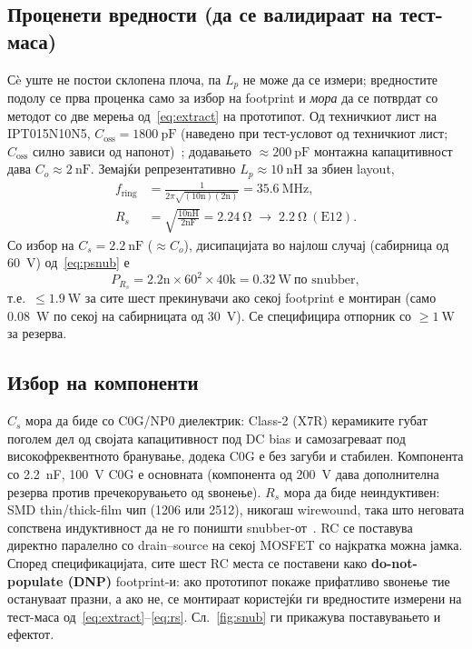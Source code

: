 \documentclass[journal,onecolumn,11pt]{IEEEtran}
\begin{document}
\subsection{Проценети вредности (да се валидираат на тест-маса)}
Сè уште не постои склопена плоча, па $L_p$ не може да се измери; вредностите подолу се
прва проценка само за избор на footprint и \emph{мора} да се потврдат со методот со
две мерења од~\eqref{eq:extract} на прототипот. Од техничкиот лист на IPT015N10N5,
$C_{\mathrm{oss}}=\SI{1800}{\pico\farad}$ (наведено при тест-условот од техничкиот лист;
$C_{\mathrm{oss}}$ силно зависи од напонот)~\cite{ipt015ds,ipt015part}; додавањето
$\approx\SI{200}{\pico\farad}$ монтажна капацитивност дава $C_o\approx\SI{2}{\nano\farad}$.
Земајќи репрезентативно $L_p\approx\SI{10}{\nano\henry}$ за збиен layout,
\begin{align}
f_{\mathrm{ring}}&=\frac{1}{2\pi\sqrt{(10\text{n})(2\text{n})}}=\SI{35.6}{\mega\hertz},\\
R_s&=\sqrt{\frac{10\text{nH}}{2\text{nF}}}=\SI{2.24}{\ohm}\;\to\;\SI{2.2}{\ohm}\ (\text{E12}).
\end{align}
Со избор на $C_s=\SI{2.2}{\nano\farad}$ ($\approx C_o$), дисипацијата во најлош случај
(сабирница од \SI{60}{\volt}) од~\eqref{eq:psnub} е
\begin{equation}
P_{R_s}=2.2\text{n}\times 60^{2}\times 40\text{k}=\SI{0.32}{\watt}\ \text{по snubber},
\end{equation}
т.е.\ $\le\SI{1.9}{\watt}$ за сите шест прекинувачи ако секој footprint е монтиран
(само \SI{0.08}{\watt} по секој на сабирницата од \SI{30}{\volt}). Се специфицира
отпорник со $\ge\SI{1}{\watt}$ за резерва.

\subsection{Избор на компоненти}
$C_s$ мора да биде со C0G/NP0 диелектрик: Class-2 (X7R) керамиките губат поголем дел
од својата капацитивност под DC bias и самозагреваат под високофреквентното бранување,
додека C0G е без загуби и стабилен. Компонента со \SI{2.2}{\nano\farad}, \SI{100}{\volt}
C0G е основната (компонента од \SI{200}{\volt} дава дополнителна резерва против
пречекорувањето од ѕвонење). $R_s$ мора да биде неиндуктивен: SMD thin/thick-film чип
(1206 или 2512), никогаш wirewound, така што неговата сопствена индуктивност да не го
поништи snubber-от~\cite{severns}. RC се поставува директно паралелно со drain--source
на секој MOSFET со најкратка можна јамка. Според спецификацијата, сите шест RC места се
поставени како \textbf{do-not-populate (DNP)} footprint-и: ако прототипот покаже
прифатливо ѕвонење тие остануваат празни, а ако не, се монтираат користејќи ги
вредностите измерени на тест-маса од~\eqref{eq:extract}--\eqref{eq:rs}.
Сл.~\ref{fig:snub} ги прикажува поставувањето и ефектот.
\end{document}
